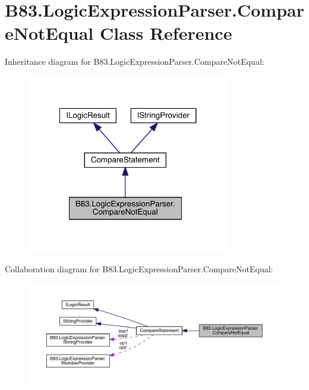 \hypertarget{class_b83_1_1_logic_expression_parser_1_1_compare_not_equal}{}\section{B83.\+Logic\+Expression\+Parser.\+Compare\+Not\+Equal Class Reference}
\label{class_b83_1_1_logic_expression_parser_1_1_compare_not_equal}


Inheritance diagram for B83.\+Logic\+Expression\+Parser.\+Compare\+Not\+Equal\+:\nopagebreak
\begin{figure}[H]
\begin{center}
\leavevmode
\includegraphics[width=251pt]{class_b83_1_1_logic_expression_parser_1_1_compare_not_equal__inherit__graph}
\end{center}
\end{figure}


Collaboration diagram for B83.\+Logic\+Expression\+Parser.\+Compare\+Not\+Equal\+:\nopagebreak
\begin{figure}[H]
\begin{center}
\leavevmode
\includegraphics[width=350pt]{class_b83_1_1_logic_expression_parser_1_1_compare_not_equal__coll__graph}
\end{center}
\end{figure}
